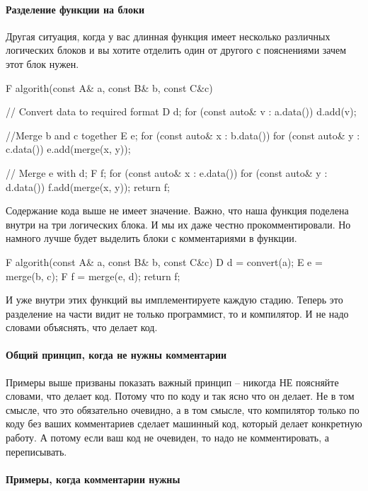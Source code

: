 \paragraph{Разделение функции на блоки}

Другая ситуация, когда у вас длинная функция имеет несколько различных логических блоков и вы хотите отделить один от другого с пояснениями зачем этот блок нужен.
\begin{cppcode}
F algorith(const A& a, const B& b, const C&c) {
  // Convert data to required format
  D d;
  for (const auto& v : a.data()) {
    d.add(v);
  }
  
  //Merge b and c together
  E e;
  for (const auto& x : b.data()) {
    for (const auto& y : c.data()) {
      e.add(merge(x, y));
    }
  }
  
  // Merge e with d;
  F f;
  for (const auto& x : e.data()) {
    for (const auto& y : d.data()) {
      f.add(merge(x, y));
    }
  }
  return f;
}
\end{cppcode}
Содержание кода выше не имеет значение.
Важно, что наша функция поделена внутри на три логических блока.
И мы их даже честно прокомментировали.
Но намного лучше будет выделить блоки с комментариями в функции.
\begin{cppcode}
F algorith(const A& a, const B& b, const C&c) {
  D d = convert(a);
  E e = merge(b, c);
  F f = merge(e, d);
  return f;
}
\end{cppcode}
И уже внутри этих функций вы имплементируете каждую стадию.
Теперь это разделение на части видит не только программист, то и компилятор.
И не надо словами объяснять, что делает код.

\paragraph{Общий принцип, когда не нужны комментарии}

Примеры выше призваны показать важный принцип -- никогда НЕ поясняйте словами, что делает код.
Потому что по коду и так ясно что он делает.
Не в том смысле, что это обязательно очевидно, а в том смысле, что компилятор только по коду без ваших комментариев сделает машинный код, который делает конкретную работу.
А потому если ваш код не очевиден, то надо не комментировать, а переписывать.

\paragraph{Примеры, когда комментарии нужны}

